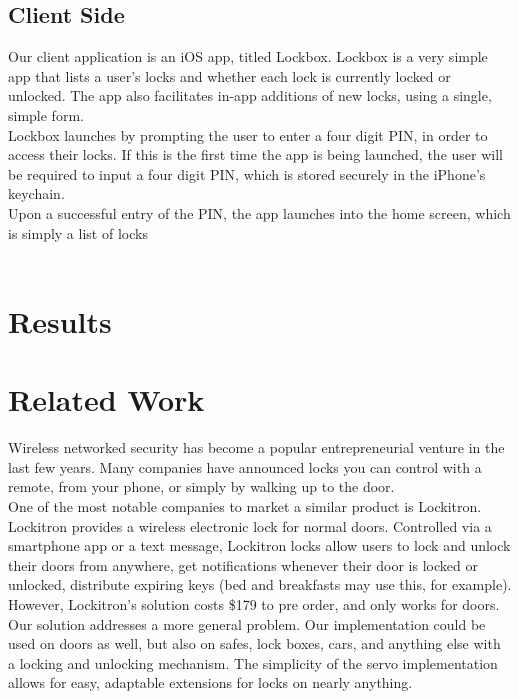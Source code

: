 \documentclass[twoside]{article}
\begin{document}
\begin{multicols}{2}
            \subsection{Client Side}
            Our client application is an iOS app, titled Lockbox. Lockbox is a very simple app that lists a user’s locks and whether each lock is currently locked or unlocked. The app also facilitates in-app additions of new locks, using a single, simple form. \\
            Lockbox launches by prompting the user to enter a four digit PIN, in order to access their locks. If this is the first time the app is being launched, the user will be required to input a four digit PIN, which is stored securely in the iPhone’s keychain. \\
            Upon a successful entry of the PIN, the app launches into the home screen, which is simply a list of locks\\
\\
            \section{Results}

            \section{Related Work}
            Wireless networked security has become a popular entrepreneurial venture in the last few years. Many companies have announced locks you can control with a remote, from your phone, or simply by walking up to the door. \\
            One of the most notable companies to market a similar product is Lockitron. Lockitron provides a wireless electronic lock for normal doors. Controlled via a smartphone app or a text message, Lockitron locks allow users to lock and unlock their doors from anywhere, get notifications whenever their door is locked or unlocked, distribute expiring keys (bed and breakfasts may use this, for example). \\
            However, Lockitron’s solution costs \$179 to pre order, and only works for doors. Our solution addresses a more general problem. Our implementation could be used on doors as well, but also on safes, lock boxes, cars, and anything else with a locking and unlocking mechanism. The simplicity of the servo implementation allows for easy, adaptable extensions for locks on nearly anything.\\
\\

\end{multicols}
\end{document}
